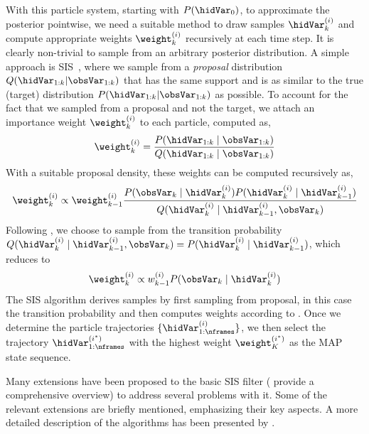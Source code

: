 With this particle system, starting with $P(\hidVar_0)$, to approximate the posterior pointwise, we need a suitable method to draw samples $\hidVar^{(i)}_k$ and compute appropriate weights $\weight_{k}^{(i)}$ recursively at each time step. It is clearly non-trivial to sample from an arbitrary posterior distribution. A simple approach is \gls{SIS}~\cite{doucet:09:tutorial}, where we sample from a \textsl{proposal} distribution $Q(\hidVar_{1:k} | \obsVar_{1:k})$ that has the same support and is as similar to the true (target) distribution $P(\hidVar_{1:k} | \obsVar_{1:k})$ as possible. To account for the fact that we sampled from a proposal and not the target, we attach an importance weight $\weight^{(i)}_k$ to each particle, computed as, 
\begin{equation}\label{eqn:bpminf:proposal}
\weight^{(i)}_{k} = \frac{P(\hidVar_{1:k} \mid \obsVar_{1:k})}{Q(\hidVar_{1:k} \mid \obsVar_{1:k})}
\end{equation}
With a suitable proposal density, these weights can be computed recursively as, 
\begin{equation}\label{eqn:bpminf:wtupdate}
\weight_{k}^{(i)}\propto \weight_{k-1}^{(i)}\frac{P(\obsVar_{k} \mid \hidVar_{k}^{(i)})P(\hidVar_{k}^{(i)} \mid \hidVar_{k-1}^{(i)})}{Q(\hidVar_{k}^{(i)} \mid \hidVar_{k-1}^{(i)},\obsVar_{k})}
\end{equation}
Following , we choose to sample from the transition probability $Q(\hidVar_{k}^{(i)} \mid \hidVar_{k-1}^{(i)},\obsVar_{k}) = P(\hidVar_{k}^{(i)} \mid \hidVar_{k-1}^{(i)})$, which reduces  to 
\begin{equation}\label{eqn:bpminf:wtSIS}
\weight_{k}^{(i)}\propto w_{k-1}^{(i)}P(\obsVar_{k} \mid \hidVar_{k}^{(i)})
\end{equation}
The \gls{SIS} algorithm derives samples by first sampling from proposal, in this case the transition probability and then computes weights according to . Once we determine the particle trajectories $\{\hidVar^{(i)}_{1:\nframes}\}$, we then select the trajectory $\hidVar^{(i^{*})}_{1:\nframes}$ with the highest weight $\weight^{(i^{*})}_K$ as the \gls{MAP} state sequence. 

Many extensions have been proposed to the basic \gls{SIS} filter ( provide a comprehensive overview) to address several problems with it. Some of the relevant extensions are briefly mentioned, emphasizing their key aspects. A more detailed description of the algorithms has been presented by . 

